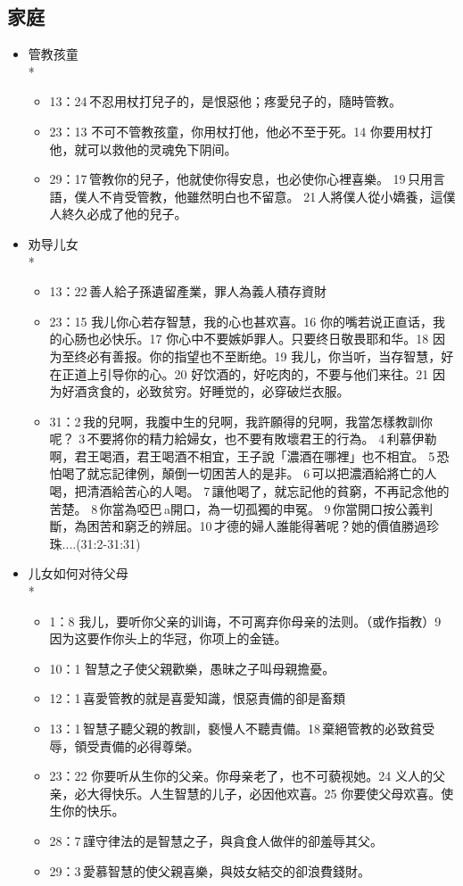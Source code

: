 \subsection{家庭}
\begin{itemize}
\itemsep-.45em 
\item 管教孩童 \\*
\begin{itemize}
\itemsep-.45em 
\item 13：24 不忍用杖打兒子的，是恨惡他；疼愛兒子的，隨時管教。
\item 23：13 不可不管教孩童，你用杖打他，他必不至于死。14 你要用杖打他，就可以救他的灵魂免下阴间。
\item 29：17 管教你的兒子，他就使你得安息，也必使你心裡喜樂。 19 只用言語，僕人不肯受管教，他雖然明白也不留意。 21 人將僕人從小嬌養，這僕人終久必成了他的兒子。
\end{itemize}
\item 劝导儿女 \\*
\begin{itemize}
\itemsep-.45em 
\item 13：22 善人給子孫遺留產業，罪人為義人積存資財
\item 23：15 我儿你心若存智慧，我的心也甚欢喜。16 你的嘴若说正直话，我的心肠也必快乐。17 你心中不要嫉妒罪人。只要终日敬畏耶和华。18 因为至终必有善报。你的指望也不至断绝。19 我儿，你当听，当存智慧，好在正道上引导你的心。20 好饮酒的，好吃肉的，不要与他们来往。21 因为好酒贪食的，必致贫穷。好睡觉的，必穿破烂衣服。
\item 31：2 我的兒啊，我腹中生的兒啊，我許願得的兒啊，我當怎樣教訓你呢？ 3 不要將你的精力給婦女，也不要有敗壞君王的行為。 4 利慕伊勒啊，君王喝酒，君王喝酒不相宜，王子說「濃酒在哪裡」也不相宜。 5 恐怕喝了就忘記律例，顛倒一切困苦人的是非。 6 可以把濃酒給將亡的人喝，把清酒給苦心的人喝。 7 讓他喝了，就忘記他的貧窮，不再記念他的苦楚。 8 你當為啞巴 a開口，為一切孤獨的申冤。 9 你當開口按公義判斷，為困苦和窮乏的辨屈。10 才德的婦人誰能得著呢？她的價值勝過珍珠....(31:2-31:31)
\end{itemize}
\item 儿女如何对待父母 \\*
\begin{itemize}
\itemsep-.45em 
\item 1：8 我儿，要听你父亲的训诲，不可离弃你母亲的法则。（或作指教）9 因为这要作你头上的华冠，你项上的金链。
\item 10：1 智慧之子使父親歡樂，愚昧之子叫母親擔憂。
\item 12：1 喜愛管教的就是喜愛知識，恨惡責備的卻是畜類
\item 13：1 智慧子聽父親的教訓，褻慢人不聽責備。18 棄絕管教的必致貧受辱，領受責備的必得尊榮。
\item 23：22 你要听从生你的父亲。你母亲老了，也不可藐视她。24 义人的父亲，必大得快乐。人生智慧的儿子，必因他欢喜。25 你要使父母欢喜。使生你的快乐。
\item 28：7 謹守律法的是智慧之子，與貪食人做伴的卻羞辱其父。
\item 29：3 愛慕智慧的使父親喜樂，與妓女結交的卻浪費錢財。
\end{itemize}
\end{itemize}

